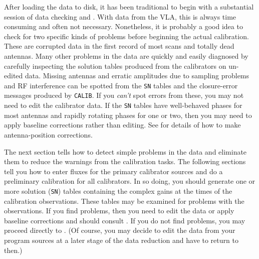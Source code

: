 
     After loading the data to disk, it has been traditional to begin
with a substantial session of data checking and .  With
data from the VLA, this is always time consuming and often not
necessary. Nonetheless, it is probably a good idea to check for two
specific kinds of problems before beginning the actual calibration.
These are corrupted data in the first record of most scans and totally
dead antennas.  Many other problems in the data are quickly and easily
diagnosed by carefully inspecting the solution tables produced from
the calibrators on un-edited data.  Missing antennas and erratic
amplitudes due to sampling problems and RF interference can be spotted
from the {\tt SN} tables and the closure-error messages produced by
{\tt CALIB}\@.  If you {\it can't\/} spot errors from these, you
may not need to edit the calibrator data.  If the {\tt SN} tables have
well-behaved phases for most antennas and rapidly rotating phases for
one or two, then you may need to apply baseline corrections rather
than editing.  See  for details of how to make
antenna-position corrections.

     The next section tells how to detect simple problems in the data
and eliminate them to reduce the warnings from the calibration tasks.
The following sections tell you how to enter fluxes for the primary
calibrator sources and do a preliminary calibration for all
calibrators.  In so doing, you should generate one or more solution
({\tt SN}) tables containing the complex gains at the times of the
calibration observations.  These tables may be examined for problems
with the observations.  If you find problems, then you need to edit
the data or apply baseline corrections and should consult
.  If you do not find problems, you may proceed directly
to .  (Of course, you may decide to edit the data from
your program sources at a later stage of the data reduction and have
to return to  then.)


